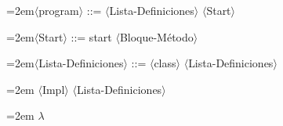 \begingroup
{}
\newcommand{\edthl}[1]{{\setlength{\fboxsep}{0pt}\colorbox{edtVerde}{\strut #1}}}
\newcommand{\edtline}[1]{\hangindent=2em\hangafter=1\noindent#1\par}
\begin{tcolorbox}[enhanced jigsaw,breakable,sharp corners,colback=white,colframe=gray,
  boxrule=0.4pt,boxsep=0pt,left=3pt,right=3pt,top=4pt,bottom=4pt,
  before skip=0.8em,after skip=0.8em]
\par\addvspace{0.65em}
\noindent\begin{minipage}{\linewidth}
\ttfamily\small\raggedright
\setlength{\parindent}{0pt}
\setlength{\parskip}{0pt}
\edtline{\ensuremath{\langle}program\ensuremath{\rangle} ::= \ensuremath{\langle}Lista-Definiciones\ensuremath{\rangle} \ensuremath{\langle}Start\ensuremath{\rangle}}
\end{minipage}\par
\par\addvspace{0.65em}
\noindent\begin{minipage}{\linewidth}
\ttfamily\small\raggedright
\setlength{\parindent}{0pt}
\setlength{\parskip}{0pt}
\edtline{\ensuremath{\langle}Start\ensuremath{\rangle} ::= start \ensuremath{\langle}Bloque-Método\ensuremath{\rangle}}
\end{minipage}\par
\par\addvspace{0.65em}
\noindent\begin{minipage}{\linewidth}
\ttfamily\small\raggedright
\setlength{\parindent}{0pt}
\setlength{\parskip}{0pt}
\edtline{\ensuremath{\langle}Lista-Definiciones\ensuremath{\rangle} ::= \ensuremath{\langle}class\ensuremath{\rangle} \ensuremath{\langle}Lista-Definiciones\ensuremath{\rangle}}
\edtline{\hspace*{2em}\textbar{} \ensuremath{\langle}Impl\ensuremath{\rangle} \ensuremath{\langle}Lista-Definiciones\ensuremath{\rangle}}
\edtline{\hspace*{2em}\textbar{} \ensuremath{\lambda}}
\end{minipage}\par
\par\addvspace{0.65em}
\noindent\begin{minipage}{\linewidth}
\ttfamily\small\raggedright
\setlength{\parindent}{0pt}

\end{minipage}
\end{tcolorbox}
